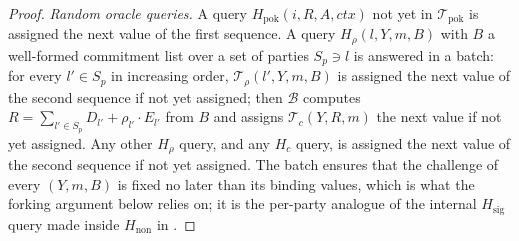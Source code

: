 \documentclass{article}
\theoremstyle{plain}
\theoremstyle{definition}
\theoremstyle{remark}
\begin{document}
\begin{proof}
  \emph{Random oracle queries.}  A query $H_{\mathrm{pok}}(i, R, A, \mathit{ctx})$ not yet in $\mathcal{T}_{\mathrm{pok}}$ is assigned the next value of the first sequence.  A query $H_\rho(l, Y, m, B)$ with $B$ a well-formed commitment list over a set of parties $S_p \ni l$ is answered in a batch: for every $l' \in S_p$ in increasing order, $\mathcal{T}_\rho(l', Y, m, B)$ is assigned the next value of the second sequence if not yet assigned; then $\mathcal{B}$ computes $R = \sum_{l' \in S_p} D_{l'} + \rho_{l'} \cdot E_{l'}$ from $B$ and assigns $\mathcal{T}_c(Y, R, m)$ the next value if not yet assigned.  Any other $H_\rho$ query, and any $H_c$ query, is assigned the next value of the second sequence if not yet assigned.  The batch ensures that the challenge of every $(Y, m, B)$ is fixed no later than its binding values, which is what the forking argument below relies on; it is the per-party analogue of the internal $H_{\mathrm{sig}}$ query made inside $H_{\mathrm{non}}$ in \cite{cgrs23}.


\end{proof}
\end{document}
